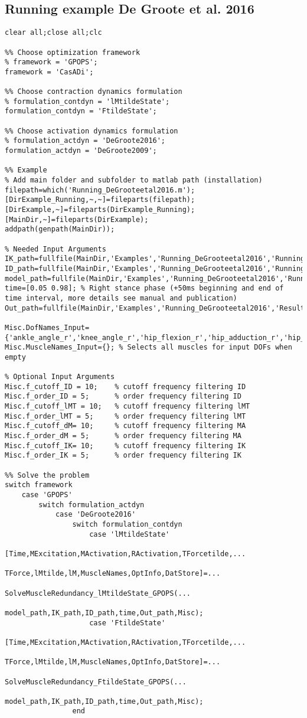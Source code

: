 \documentclass[a4paper,oneside,11pt]{article}
\begin{document}
\subsection{Running example De Groote et al. 2016}
\begin{lstlisting}[frame=none,basicstyle=\tiny]
clear all;close all;clc

%% Choose optimization framework
% framework = 'GPOPS';
framework = 'CasADi';

%% Choose contraction dynamics formulation
% formulation_contdyn = 'lMtildeState';
formulation_contdyn = 'FtildeState';

%% Choose activation dynamics formulation
% formulation_actdyn = 'DeGroote2016';
formulation_actdyn = 'DeGroote2009';

%% Example
% Add main folder and subfolder to matlab path (installation)
filepath=which('Running_DeGrooteetal2016.m');
[DirExample_Running,~,~]=fileparts(filepath); 
[DirExample,~]=fileparts(DirExample_Running);
[MainDir,~]=fileparts(DirExample);
addpath(genpath(MainDir));

% Needed Input Arguments
IK_path=fullfile(MainDir,'Examples','Running_DeGrooteetal2016','RunningData','Running_IK.mot');
ID_path=fullfile(MainDir,'Examples','Running_DeGrooteetal2016','RunningData','Running_ID.sto');
model_path=fullfile(MainDir,'Examples','Running_DeGrooteetal2016','RunningData','subject1.osim');
time=[0.05 0.98]; % Right stance phase (+50ms beginning and end of time interval, more details see manual and publication)
Out_path=fullfile(MainDir,'Examples','Running_DeGrooteetal2016','Results');

Misc.DofNames_Input={'ankle_angle_r','knee_angle_r','hip_flexion_r','hip_adduction_r','hip_rotation_r'};
Misc.MuscleNames_Input={}; % Selects all muscles for input DOFs when empty

% Optional Input Arguments
Misc.f_cutoff_ID = 10;    % cutoff frequency filtering ID
Misc.f_order_ID = 5;      % order frequency filtering ID
Misc.f_cutoff_lMT = 10;   % cutoff frequency filtering lMT
Misc.f_order_lMT = 5;     % order frequency filtering lMT
Misc.f_cutoff_dM= 10;     % cutoff frequency filtering MA
Misc.f_order_dM = 5;      % order frequency filtering MA
Misc.f_cutoff_IK= 10;     % cutoff frequency filtering IK
Misc.f_order_IK = 5;      % order frequency filtering IK

%% Solve the problem
switch framework
    case 'GPOPS'
        switch formulation_actdyn
            case 'DeGroote2016'     
                switch formulation_contdyn
                    case 'lMtildeState'
                        [Time,MExcitation,MActivation,RActivation,TForcetilde,...
                            TForce,lMtilde,lM,MuscleNames,OptInfo,DatStore]=...
                            SolveMuscleRedundancy_lMtildeState_GPOPS(...
                            model_path,IK_path,ID_path,time,Out_path,Misc);
                    case 'FtildeState'   
                        [Time,MExcitation,MActivation,RActivation,TForcetilde,...
                            TForce,lMtilde,lM,MuscleNames,OptInfo,DatStore]=...
                            SolveMuscleRedundancy_FtildeState_GPOPS(...
                            model_path,IK_path,ID_path,time,Out_path,Misc);
                end


\end{lstlisting}
\end{document}
